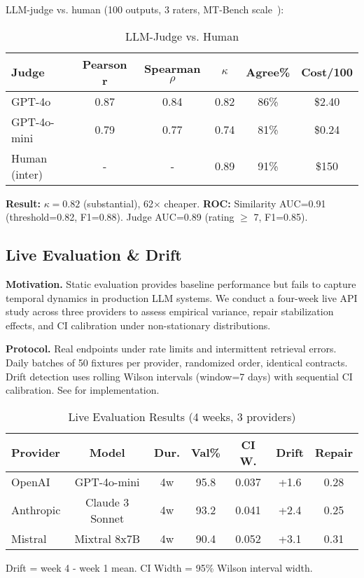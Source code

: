 \documentclass[sigconf]{acmart}
\newcommand{\breakablepath}[1]{\texttt{\seqsplit{#1}}}
\begin{document}
LLM-judge vs. human (100 outputs, 3 raters, MT-Bench scale~\cite{zheng2023judging}):

\begin{table}[H]
\centering
\caption{LLM-Judge vs. Human}
\label{tab:judge}
\scriptsize
\begin{tabular}{@{}lccccc@{}}
\toprule
\textbf{Judge} & \textbf{Pearson r} & \textbf{Spearman \( \rho \)} & \textbf{\( \kappa \)} & \textbf{Agree\%} & \textbf{Cost/100} \\
\midrule
GPT-4o & 0.87 & 0.84 & 0.82 & 86\% & \$2.40 \\
GPT-4o-mini & 0.79 & 0.77 & 0.74 & 81\% & \$0.24 \\
Human (inter) & - & - & 0.89 & 91\% & \$150 \\
\bottomrule
\end{tabular}
\end{table}

\textbf{Result:} \( \kappa = 0.82 \) (substantial), 62\(\times\) cheaper. 
\textbf{ROC:} Similarity AUC=0.91 (threshold=0.82, F1=0.88). 
Judge AUC=0.89 (rating \( \geq \) 7, F1=0.85).

\subsection{Live Evaluation \& Drift}

\textbf{Motivation.} Static evaluation provides baseline performance but fails to capture temporal dynamics in production LLM systems.
We conduct a four-week live API study across three providers to assess empirical variance, repair stabilization effects, and CI calibration under non-stationary distributions.

\textbf{Protocol.} Real endpoints under rate limits and intermittent retrieval errors.
Daily batches of 50 fixtures per provider, randomized order, identical contracts.
Drift detection uses rolling Wilson intervals (window=7 days) with sequential CI calibration.
See \breakablepath{scripts/live\_eval.py} for implementation.

\begin{table}[H]
\centering
\caption{Live Evaluation Results (4 weeks, 3 providers)}
\label{tab:live_eval}
\footnotesize
\begin{tabular}{@{}lcccccc@{}}
\toprule
\textbf{Provider} & \textbf{Model} & \textbf{Dur.} & \textbf{Val\%} & \textbf{CI W.} & \textbf{Drift} & \textbf{Repair} \\
\midrule
OpenAI & GPT-4o-mini & 4w & 95.8 & 0.037 & +1.6 & 0.28 \\
Anthropic & Claude 3 Sonnet & 4w & 93.2 & 0.041 & +2.4 & 0.25 \\
Mistral & Mixtral 8x7B & 4w & 90.4 & 0.052 & +3.1 & 0.31 \\
\bottomrule
\end{tabular}
\vspace{1mm}
\footnotesize Drift = week 4 - week 1 mean. CI Width = 95\% Wilson interval width.
\end{table}
\end{document}
